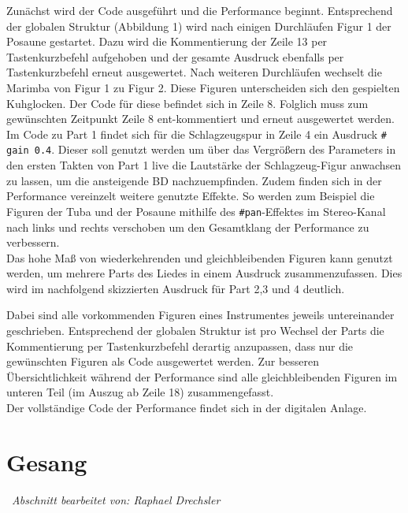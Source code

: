 \documentclass[
10pt, %
a4paper, %
oneside, %
headinclude,footinclude, %
BCOR5mm, %
]{scrartcl}
\begin{document}
\noindent Zunächst wird der Code ausgeführt und die Performance beginnt.
Entsprechend der globalen Struktur (Abbildung 1) wird nach einigen Durchläufen Figur 1 der Posaune gestartet. Dazu wird die Kommentierung der Zeile 13 per Tastenkurzbefehl aufgehoben und der gesamte Ausdruck ebenfalls per Tastenkurzbefehl erneut ausgewertet. Nach weiteren Durchläufen wechselt die Marimba von Figur 1 zu Figur 2. Diese Figuren unterscheiden sich den gespielten Kuhglocken. Der Code für diese befindet sich in Zeile 8. Folglich muss zum gewünschten Zeitpunkt Zeile 8 ent-kommentiert und erneut ausgewertet werden.\\
Im Code zu Part 1 findet sich für die Schlagzeugspur in Zeile 4 ein Ausdruck \verb|# gain 0.4|. Dieser soll genutzt werden um über das Vergrößern des Parameters in den ersten Takten von Part 1 live die Lautstärke der Schlagzeug-Figur anwachsen zu lassen, um die ansteigende BD nachzuempfinden. Zudem finden sich in der Performance vereinzelt weitere genutzte Effekte. So werden zum Beispiel die Figuren der Tuba und der Posaune mithilfe des \verb|#pan|-Effektes\cite{tid15} im Stereo-Kanal nach links und rechts verschoben um den Gesamtklang der Performance zu verbessern.\\

\noindent Das hohe Maß von wiederkehrenden und gleichbleibenden Figuren kann genutzt werden, um mehrere Parts des Liedes in einem Ausdruck zusammenzufassen. Dies wird im nachfolgend skizzierten Ausdruck für Part 2,3 und 4 deutlich. 



\noindent Dabei sind alle vorkommenden Figuren eines Instrumentes jeweils untereinander geschrieben. Entsprechend der globalen Struktur ist pro Wechsel der Parts die Kommentierung per Tastenkurzbefehl derartig anzupassen, dass nur die gewünschten Figuren als Code ausgewertet werden. Zur besseren Übersichtlichkeit während der Performance sind alle gleichbleibenden Figuren im unteren Teil (im Auszug ab Zeile 18) zusammengefasst.\\

\noindent Der vollständige Code der Performance findet sich in der digitalen Anlage.


\section{Gesang}\
\textit{Abschnitt bearbeitet von: Raphael Drechsler}\\
\end{document}
